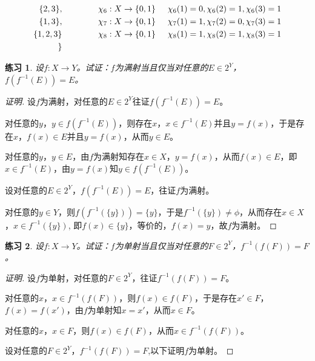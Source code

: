 \documentclass{article}
\newtheorem{Exercise}{练习}
\begin{document}
\begin{CJK*}{UTF8}{gbsn}
\begin{align*}
    \{2,3\},&\hspace{1.5cm}\chi_6:X\to \{0,1\}\hspace{0.5cm} \chi_6(1)=0,\chi_6(2)=1,\chi_6(3)=1\\
    \{1,3\},&\hspace{1.5cm}\chi_7:X\to \{0,1\}\hspace{0.5cm} \chi_7(1)=1,\chi_7(2)=0,\chi_7(3)=1\\
    \{1,2,3\}&\hspace{1.5cm}\chi_8:X\to \{0,1\}\hspace{0.5cm} \chi_8(1)=1,\chi_8(2)=1,\chi_8(3)=1\\
    \}\\
  \end{align*}

  \begin{Exercise}
    设$f:X\to Y$。试证：$f$为满射当且仅当对任意的$E\in 2^Y$，$f(f^{-1}(E))=E$。
    \end{Exercise}
    \begin{proof}[证明]
      设$f$为满射，对任意的$E\in 2^Y$往证$f(f^{-1}(E))=E$。
    
      对任意的$y$，$y\in f(f^{-1}(E))$，则存在$x$，$x\in f^{-1}(E)$并且$y=f(x)$，于是存在$x$，$f(x) \in E$并且$y=f(x)$，从而$y\in E$。
    
      对任意的$y$，$y\in E$，由$f$为满射知存在$x\in X$，$y=f(x)$，从而$f(x)\in E$，即$x\in f^{-1}(E)$，由$y=f(x)$知$y\in f(f^{-1}(E))$。
    
      设对任意的$E\in 2^Y$，$f(f^{-1}(E))=E$，往证$f$为满射。
    
      对任意的$y\in Y$，则$f(f^{-1}(\{y\}))=\{y\}$，于是$f^{-1}(\{y\})\neq \phi$，从而存在$x\in X$，$x\in f^{-1}(\{y\})$, 即$f(x)\in \{y\}$，等价的，$f(x)=y$，故$f$为满射。
    \end{proof}
    \begin{Exercise}
      设$f:X\to Y$。试证：$f$为单射当且仅当对任意的$F\in 2^Y$，$f^{-1}(f(F))=F$。
      \end{Exercise}
      \begin{proof}[证明]
        设$f$为单射，对任意的$F\in 2^Y$，往证$f^{-1}(f(F))=F$。
      
        对任意的$x$，$x\in f^{-1}(f(F))$，则$f(x)\in f(F)$，于是存在$x'\in F$，$f(x)=f(x')$，由$f$为单射知$x=x'$，从而$x\in F$。
      
        对任意的$x$，$x\in F$，则$f(x)\in f(F)$，从而$x\in f^{-1}(f(F))$。
      
        设对任意的$F\in 2^Y$，$f^{-1}(f(F))=F$,以下证明$f$为单射。
      

\end{proof}
\end{CJK*}
\end{document}
